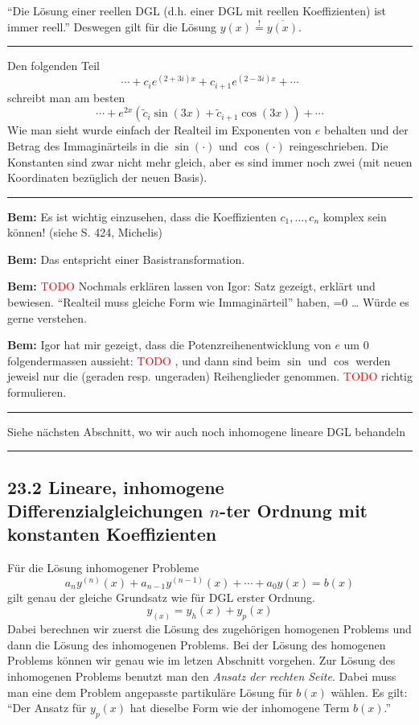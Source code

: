 \documentclass[a4paper,landscape,8pt]{extarticle}
\newcommand{\todo}{\textcolor{red}{TODO }}
\newcommand{\sep}{\vspace{5pt}\noindent\hrule\vspace{5pt}}
\newcommand{\Bem}{\textbf{Bem: }}
\begin{document}
\begin{multicols*}{4}
\begin{warmup}
``Die Lösung einer reellen DGL (d.h. einer DGL mit reellen Koeffizienten) ist
immer reell.'' Deswegen gilt für die Lösung
$y(x)\stackrel{!}{=}\overline{y(x)}$.

\end{warmup}

\sep

\Bsp Den folgenden Teil 
\[ 
\cdots + c_ie^{(2+3i)x} + c_{i+1}e^{(2-3i)x} + \cdots
\] 
schreibt man am besten 
\[ 
\cdots +
e^{2x}\left(\widetilde{c}_i\sin(3x)+\widetilde{c}_{i+1}\cos(3x)\right)
+ \cdots
\]
Wie man sieht wurde einfach der Realteil im Exponenten von $e$ behalten und der
Betrag des Immaginärteils in die $\sin(\cdot)$ und $\cos(\cdot)$
reingeschrieben. Die Konstanten sind zwar nicht mehr gleich, aber es sind immer
noch zwei (mit neuen Koordinaten bezüglich der neuen Basis).

\sep

\Bem Es ist wichtig einzusehen, dass die Koeffizienten $c_1, \ldots, c_n$
komplex sein können! (siehe S. 424, Michelis)

\Bem Das entspricht einer Basistransformation.

\begin{warmup}
\Bem \todo Nochmals erklären lassen von Igor: Satz gezeigt, erklärt und
bewiesen. ``Realteil muss gleiche Form wie Immaginärteil'' haben, =0 \ldots
Würde es gerne verstehen.
\end{warmup}

\begin{warmup}
\Bem Igor hat mir gezeigt, dass die Potenzreihenentwicklung von $e$ um 0
folgendermassen aussieht: \todo , und dann sind beim $\sin$ und $\cos$ werden
jeweisl nur die (geraden resp. ungeraden) Reihenglieder genommen. \todo richtig
formulieren.
\end{warmup}

\begin{warmup}
\sep

\Bsp Siehe nächsten Abschnitt, wo wir auch noch inhomogene lineare DGL behandeln

\sep
\end{warmup}

\subsection{23.2 Lineare, inhomogene Differenzialgleichungen $n$-ter Ordnung
mit konstanten Koeffizienten}

\begin{warmup}
Für die Lösung inhomogener Probleme
\[
a_ny^{(n)}(x) + a_{n-1}y^{(n-1)}(x) + \cdots + a_0y(x) = b(x)
\]
gilt genau der gleiche Grundsatz wie für DGL erster Ordnung.
\[
y_(x) = y_h(x) + y_p(x)
\]
Dabei berechnen wir zuerst die Lösung des zugehörigen homogenen Problems und
dann die Lösung des inhomogenen Problems. Bei der Lösung des homogenen Problems
können wir genau wie im letzen Abschnitt vorgehen. Zur Lösung des inhomogenen
Problems benutzt man den \emph{Ansatz der rechten Seite}. Dabei muss man eine
dem Problem angepasste partikuläre Lösung für $b(x)$ wählen. Es gilt: ``Der
Ansatz für $y_p(x)$ hat dieselbe Form wie der inhomogene Term $b(x)$.''


\end{warmup}
\end{multicols*}
\end{document}
